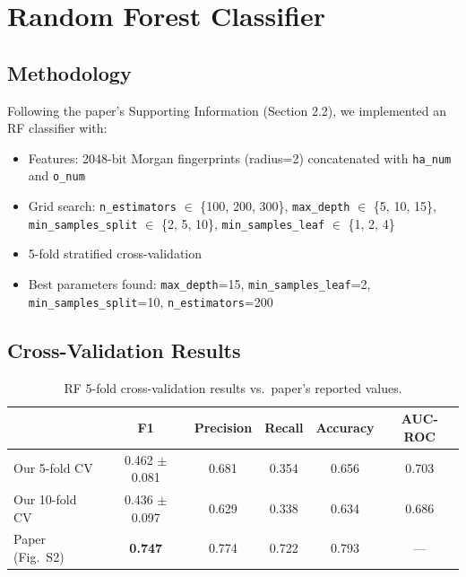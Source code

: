 \documentclass[11pt,a4paper]{article}
\begin{document}
\section{Random Forest Classifier}

\subsection{Methodology}

Following the paper's Supporting Information (Section 2.2), we implemented an RF classifier with:
\begin{itemize}[nosep]
    \item Features: 2048-bit Morgan fingerprints (radius=2) concatenated with \texttt{ha\_num} and \texttt{o\_num}
    \item Grid search: \texttt{n\_estimators} $\in$ \{100, 200, 300\}, \texttt{max\_depth} $\in$ \{5, 10, 15\}, \texttt{min\_samples\_split} $\in$ \{2, 5, 10\}, \texttt{min\_samples\_leaf} $\in$ \{1, 2, 4\}
    \item 5-fold stratified cross-validation
    \item Best parameters found: \texttt{max\_depth}=15, \texttt{min\_samples\_leaf}=2, \texttt{min\_samples\_split}=10, \texttt{n\_estimators}=200
\end{itemize}

\subsection{Cross-Validation Results}

\begin{table}[H]
\centering
\caption{RF 5-fold cross-validation results vs.\ paper's reported values.}
\label{tab:rf_cv}
\begin{tabular}{lccccc}
\toprule
 & F1 & Precision & Recall & Accuracy & AUC-ROC \\
\midrule
Our 5-fold CV & 0.462 $\pm$ 0.081 & 0.681 & 0.354 & 0.656 & 0.703 \\
Our 10-fold CV & 0.436 $\pm$ 0.097 & 0.629 & 0.338 & 0.634 & 0.686 \\
Paper (Fig.~S2) & \textbf{0.747} & 0.774 & 0.722 & 0.793 & --- \\
\bottomrule
\end{tabular}
\end{table}
\end{document}
